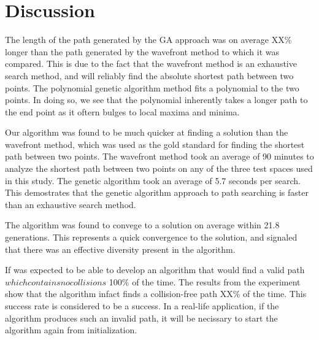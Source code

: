 	
	
\section{Discussion}

The length of the path generated by the GA approach was on average XX\% longer than the path generated by the wavefront method to which it was compared. This is due to the fact that the wavefront method is an exhaustive search method, and will reliably find the absolute shortest path between two points. The polynomial genetic algorithm method fits a polynomial to the two points. In doing so, we see that the polynomial inherently takes a longer path to the end point as it oftern bulges to local maxima and minima.

Our algorithm was found to be much quicker at finding a solution than the wavefront method, which was used as the gold standard for finding the shortest path between two points. The wavefront method took an average of 90 minutes to analyze the shortest path between two points on any of the three test spaces used in this study. The genetic algorithm took an average of 5.7 seconds per search. This demostrates that the genetic algorithm approach to path searching is faster than an exhaustive search method.

The algorithm was found to convege to a solution on average within 21.8 generations. This represents a quick convergence to the solution, and signaled that there was an effective diversity present in the algorithm.

If was expected to be able to develop an algorithm that would find a valid path \(which contains no collisions\) 100\% of the time. The results from the experiment show that the algorithm infact finds a collision-free path XX\% of the time. This success rate is considered to be a success. In a real-life application, if the algorithm produces such an invalid path, it will be necissary to start the algorithm again from initialization. 

